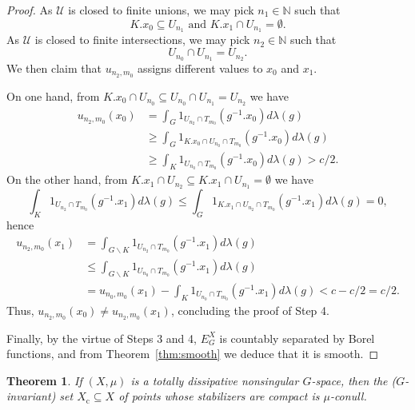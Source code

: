 \documentclass{amsart}
\numberwithin{equation}{subsection}
\newtheorem{thm}{Theorem}[section]
\begin{document}
\begin{proof}
As \(\mathcal{U}\) is closed to finite unions, we may pick \(n_{1}\in\mathbb{N}\) such that
\[K.x_{0}\subseteq U_{n_{1}}\text{ and }K.x_{1}\cap U_{n_{1}}=\emptyset.\]
As \(\mathcal{U}\) is closed to finite intersections, we may pick \(n_{2}\in\mathbb{N}\) such that
\[U_{n_{0}}\cap U_{n_{1}}=U_{n_{2}}.\]
We then claim that \(u_{n_{2},m_{0}}\) assigns different values to \(x_{0}\) and \(x_{1}\).

On one hand, from \(K.x_{0}\cap U_{n_{0}}\subseteq U_{n_{0}}\cap U_{n_{1}}=U_{n_{2}}\) we have
\begin{align*}
u_{n_{2},m_{0}}\left(x_{0}\right)
&=\int_{G}1_{U_{n_{2}}\cap T_{m_{0}}}\left(g^{-1}.x_{0}\right)d\lambda\left(g\right)\\
&\geq\int_{G}1_{K.x_{0}\cap U_{n_{0}}\cap T_{m_{0}}}\left(g^{-1}.x_{0}\right)d\lambda\left(g\right)\\
&\geq\int_{K}1_{U_{n_{0}}\cap T_{m_{0}}}\left(g^{-1}.x_{0}\right)d\lambda\left(g\right)>c/2.
\end{align*}
On the other hand, from \(K.x_{1}\cap U_{n_{2}}\subseteq K.x_{1}\cap U_{n_{1}}=\emptyset\) we have
\[\int_{K}1_{U_{n_{2}}\cap T_{m_{0}}}\left(g^{-1}.x_{1}\right)d\lambda\left(g\right)\leq\int_{G}1_{K.x_{1}\cap U_{n_{2}}\cap T_{m_{0}}}\left(g^{-1}.x_{1}\right)d\lambda\left(g\right)=0,\]
hence
\begin{align*}
u_{n_{2},m_{0}}\left(x_{1}\right)
&=\int_{G\backslash K}1_{U_{n_{2}}\cap T_{m_{0}}}\left(g^{-1}.x_{1}\right)d\lambda\left(g\right)\\
&\leq\int_{G\backslash K}1_{U_{n_{0}}\cap T_{m_{0}}}\left(g^{-1}.x_{1}\right)d\lambda\left(g\right)\\
&=u_{n_{0},m_{0}}\left(x_{1}\right)-\int_{K}1_{U_{n_{0}}\cap T_{m_{0}}}\left(g^{-1}.x_{1}\right)d\lambda\left(g\right)<c-c/2=c/2.
\end{align*}
Thus, \(u_{n_{2},m_{0}}\left(x_{0}\right)\neq u_{n_{2},m_{0}}\left(x_{1}\right)\), concluding the proof of Step 4.

Finally, by the virtue of Steps 3 and 4, \(E_{G}^{X}\) is countably separated by Borel functions, and from Theorem~\ref{thm:smooth} we deduce that it is smooth.
\end{proof}

\begin{thm}
\label{thm:compstab}
If \(\left(X,\mu\right)\) is a totally dissipative nonsingular \(G\)-space, then the (\(G\)-invariant) set \(X_{\mathrm{c}}\subseteq X\) of points whose stabilizers are compact is \(\mu\)-conull.
\end{thm}
\end{document}
